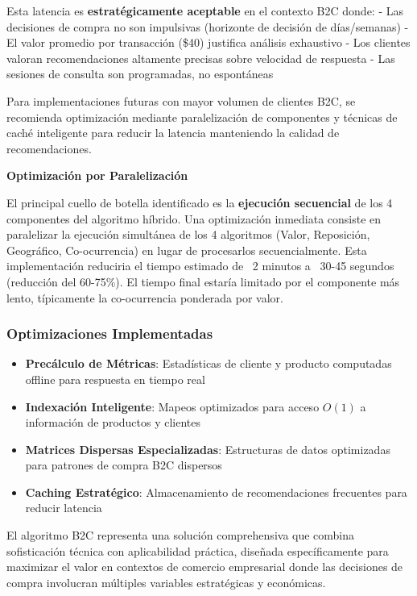 \documentclass[twocolumn]{article}
\begin{document}
Esta latencia es \textbf{estratégicamente aceptable} en el contexto B2C donde:
- Las decisiones de compra no son impulsivas (horizonte de decisión de días/semanas)
- El valor promedio por transacción (\$40) justifica análisis exhaustivo
- Los clientes valoran recomendaciones altamente precisas sobre velocidad de respuesta
- Las sesiones de consulta son programadas, no espontáneas

Para implementaciones futuras con mayor volumen de clientes B2C, se recomienda optimización mediante paralelización de componentes y técnicas de caché inteligente para reducir la latencia manteniendo la calidad de recomendaciones.

\textbf{Optimización por Paralelización}

El principal cuello de botella identificado es la \textbf{ejecución secuencial} de los 4 componentes del algoritmo híbrido. Una optimización inmediata consiste en paralelizar la ejecución simultánea de los 4 algoritmos (Valor, Reposición, Geográfico, Co-ocurrencia) en lugar de procesarlos secuencialmente. Esta implementación reduciria el tiempo estimado de ~2 minutos a ~30-45 segundos (reducción del 60-75\%). El tiempo final estaría limitado por el componente más lento, típicamente la co-ocurrencia ponderada por valor.

\subsubsection{Optimizaciones Implementadas}

\begin{itemize}
    \item \textbf{Precálculo de Métricas}: Estadísticas de cliente y producto computadas offline para respuesta en tiempo real
    \item \textbf{Indexación Inteligente}: Mapeos optimizados para acceso \(O(1)\) a información de productos y clientes
    \item \textbf{Matrices Dispersas Especializadas}: Estructuras de datos optimizadas para patrones de compra B2C dispersos
    \item \textbf{Caching Estratégico}: Almacenamiento de recomendaciones frecuentes para reducir latencia
\end{itemize}

El algoritmo B2C representa una solución comprehensiva que combina sofisticación técnica con aplicabilidad práctica, diseñada específicamente para maximizar el valor en contextos de comercio empresarial donde las decisiones de compra involucran múltiples variables estratégicas y económicas.
\end{document}
